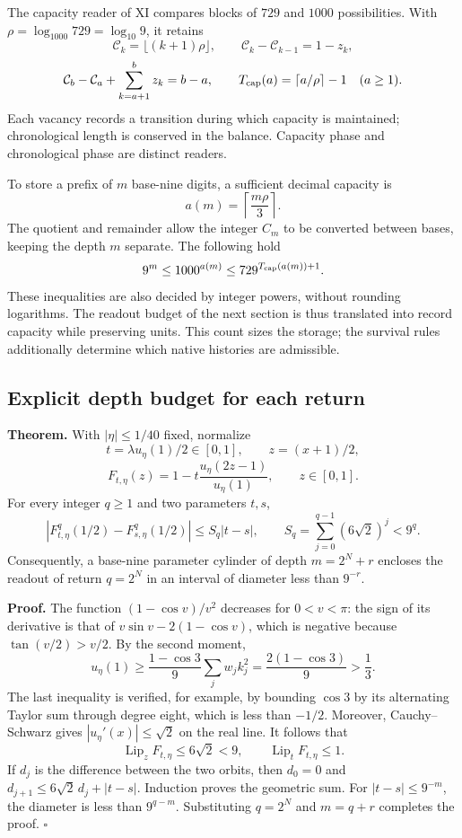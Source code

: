 The capacity reader of XI compares blocks of \(729\) and \(1000\) possibilities. With \(\rho=\log_{1000}729=\log_{10}9\), it retains
\[
\mathcal C_k=\lfloor(k+1)\rho\rfloor,\qquad
\mathcal C_k-\mathcal C_{k-1}=1-z_k,
\]
\[
\mathcal C_b-\mathcal C_a+\sum_{k=a+1}^b z_k=b-a,
\qquad T_{\rm cap}(a)=\lceil a/\rho\rceil-1\quad(a\ge1).
\]
Each vacancy records a transition during which capacity is maintained; chronological length is conserved in the balance. Capacity phase and chronological phase are distinct readers.

To store a prefix of \(m\) base-nine digits, a sufficient decimal capacity is
\[
a(m)=\left\lceil\frac{m\rho}{3}\right\rceil.
\]
The quotient and remainder allow the integer \(C_m\) to be converted between bases, keeping the depth \(m\) separate. The following hold
\[
9^m\le1000^{a(m)}\le729^{T_{\rm cap}(a(m))+1}.
\]
These inequalities are also decided by integer powers, without rounding logarithms. The readout budget of the next section is thus translated into record capacity while preserving units. This count sizes the storage; the survival rules additionally determine which native histories are admissible.


\subsection{Explicit depth budget for each return}
\label{hmtfg:prolongacion:3}

\textbf{Theorem.} With \(|\eta|\le1/40\) fixed, normalize
\[
t=\lambda u_\eta(1)/2\in[0,1],\qquad z=(x+1)/2,
\]
\[
F_{t,\eta}(z)=1-t\frac{u_\eta(2z-1)}{u_\eta(1)},\qquad z\in[0,1].
\]
For every integer \(q\ge1\) and two parameters \(t,s\),
\[
\left|F_{t,\eta}^{q}(1/2)-F_{s,\eta}^{q}(1/2)\right|
\le S_q|t-s|,
\qquad S_q=\sum_{j=0}^{q-1}(6\sqrt2)^j<9^q.
\]
Consequently, a base-nine parameter cylinder of depth \(m=2^N+r\) encloses the readout of return \(q=2^N\) in an interval of diameter less than \(9^{-r}\).

\textbf{Proof.} The function \((1-\cos v)/v^2\) decreases for \(0<v<\pi\): the sign of its derivative is that of \(v\sin v-2(1-\cos v)\), which is negative because \(\tan(v/2)>v/2\). By the second moment,
\[
u_\eta(1)\ge\frac{1-\cos3}{9}\sum_jw_jk_j^2
=\frac{2(1-\cos3)}9>\frac13.
\]
The last inequality is verified, for example, by bounding \(\cos3\) by its alternating Taylor sum through degree eight, which is less than \(-1/2\). Moreover, Cauchy–Schwarz gives \(|u_\eta'(x)|\le\sqrt2\) on the real line. It follows that
\[
\operatorname{Lip}_zF_{t,\eta}\le6\sqrt2<9,\qquad
\operatorname{Lip}_tF_{t,\eta}\le1.
\]
If \(d_j\) is the difference between the two orbits, then \(d_0=0\) and \(d_{j+1}\le6\sqrt2\,d_j+|t-s|\). Induction proves the geometric sum. For \(|t-s|\le9^{-m}\), the diameter is less than \(9^{q-m}\). Substituting \(q=2^N\) and \(m=q+r\) completes the proof. \(\square\)

